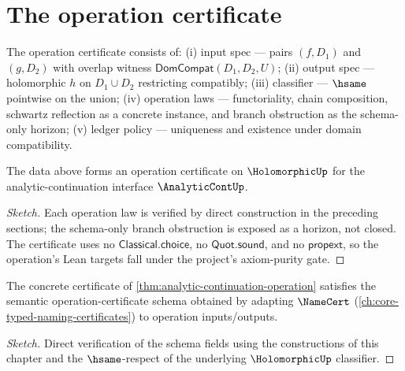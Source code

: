 \section{The operation certificate}

\begin{definition}
\label{def:ana-cont-op-cert}
The operation certificate consists of: (i) input spec --- pairs \((f, D_1)\) and \((g, D_2)\) with overlap witness \(\mathsf{DomCompat}(D_1, D_2, U)\); (ii) output spec --- holomorphic \(h\) on \(D_1 \cup D_2\) restricting compatibly; (iii) classifier --- \(\hsame\) pointwise on the union; (iv) operation laws --- functoriality, chain composition, schwartz reflection as a concrete instance, and branch obstruction as the schema-only horizon; (v) ledger policy --- uniqueness and existence under domain compatibility.
\end{definition}

\begin{theorem}
\label{thm:analytic-continuation-operation}
The data above forms an operation certificate on \(\HolomorphicUp\) for the analytic-continuation interface \(\AnalyticContUp\).
\end{theorem}
\begin{proof}[Sketch]
Each operation law is verified by direct construction in the preceding sections; the schema-only branch obstruction is exposed as a horizon, not closed. The certificate uses no \(\mathsf{Classical.choice}\), no \(\mathsf{Quot.sound}\), and no \(\mathsf{propext}\), so the operation's Lean targets fall under the project's axiom-purity gate.
\end{proof}

\begin{theorem}
\label{thm:analytic-continuation-semantic}
The concrete certificate of \autoref{thm:analytic-continuation-operation} satisfies the semantic operation-certificate schema obtained by adapting \(\NameCert\) (\autoref{ch:core-typed-naming-certificates}) to operation inputs/outputs.
\end{theorem}
\begin{proof}[Sketch]
Direct verification of the schema fields using the constructions of this chapter and the \(\hsame\)-respect of the underlying \(\HolomorphicUp\) classifier.
\end{proof}


